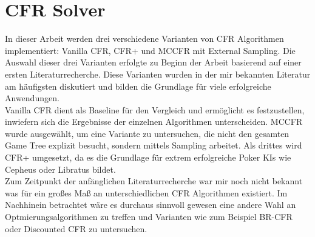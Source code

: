 \section{CFR Solver}
In dieser Arbeit werden drei verschiedene Varianten von CFR Algorithmen implementiert: Vanilla CFR, CFR+ und MCCFR mit External Sampling.
Die Auswahl dieser drei Varianten erfolgte zu Beginn der Arbeit basierend auf einer ersten Literaturrecherche. 
Diese Varianten wurden in der mir bekannten Literatur am häufigsten diskutiert und bilden die Grundlage für viele erfolgreiche Anwendungen.\\
Vanilla CFR dient als Baseline für den Vergleich und ermöglicht es festzustellen, inwiefern sich die Ergebnisse der einzelnen Algorithmen unterscheiden.
MCCFR wurde ausgewählt, um eine Variante zu untersuchen, die nicht den gesamten Game Tree explizit besucht, sondern mittels Sampling arbeitet. 
Als drittes wird CFR+ umgesetzt, da es die Grundlage für extrem erfolgreiche Poker KIs wie Cepheus oder Libratus bildet.\\
Zum Zeitpunkt der anfänglichen Literaturrecherche war mir noch nicht bekannt was für ein großes Maß an unterschiedlichen CFR Algorithmen existiert.
Im Nachhinein betrachtet wäre es durchaus sinnvoll gewesen eine andere Wahl an Optmierungsalgorithmen zu treffen und Varianten wie zum Beispiel BR-CFR oder Discounted CFR zu untersuchen.

